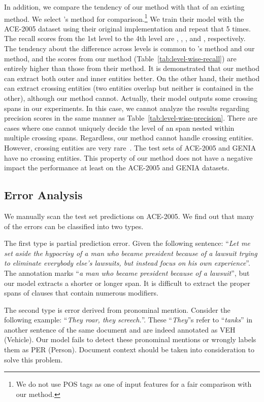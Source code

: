 \documentclass[11pt,a4paper]{article}
\def\tabref#1{Table~\ref{#1}}
\begin{document}
In addition, we compare the tendency of our method with that of an existing method.
We select \citet{wang-lu-2018-neural}'s method for comparison.\footnote{We do not use POS tags as one of input features for a fair comparison with our method.}
We train their model with the ACE-2005 dataset using their original implementation and repeat that 5 times.
The recall scores from the 1st level to the 4th level are , , , and , respectively.
The tendency about the difference across levels is common to \citet{wang-lu-2018-neural}'s method and our method, and the scores from our method (\tabref{tab:level-wise-recall}) are entirely higher than those from their method.
It is demonstrated that our method can extract both outer and inner entities better.
On the other hand, their method can extract crossing entities (two entities overlap but neither is contained in the other), although our method cannot.
Actually, their model outputs some crossing spans in our experiments.
In this case, we cannot analyze the results regarding precision scores in the same manner as \tabref{tab:level-wise-precision}.
There are cases where one cannot uniquely decide the level of an span nested within multiple crossing spans.
Regardless, our method cannot handle crossing entities.
However, crossing entities are very rare~\cite{lu-roth-2015-joint,wang-etal-2018-neural-transition}.
The test sets of ACE-2005 and GENIA have no crossing entities.
This property of our method does not have a negative impact the performance at least on the ACE-2005 and GENIA datasets.

\subsection{Error Analysis}

We manually scan the test set predictions on ACE-2005.
We find out that many of the errors can be classified into two types.

The first type is partial prediction error.
Given the following sentence: ``{\it Let me set aside the hypocrisy of a man who became president because of a lawsuit trying to eliminate everybody else's lawsuits, but instead focus on his own experience}''.
The annotation marks ``{\it a man who became president because of a lawsuit}'', but our model extracts a shorter or longer span. 
It is difficult to extract the proper spans of clauses that contain numerous modifiers.

The second type is error derived from pronominal mention.
Consider the following example: ``{\it They roar, they screech.}''.
These ``{\it They}''s refer to ``{\it tanks}'' in another sentence of the same document and are indeed annotated as VEH (Vehicle).
Our model fails to detect these pronominal mentions or wrongly labels them as PER (Person).
Document context should be taken into consideration to solve this problem.
\end{document}
